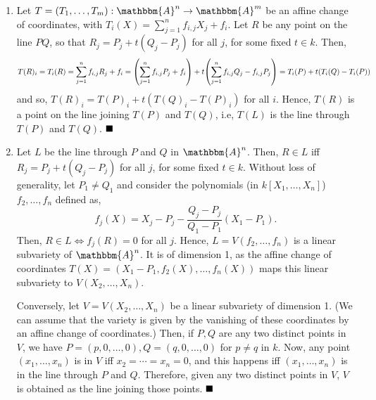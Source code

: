 \documentclass[12pt]{article}
\begin{document}
\begin{enumerate}[label = (\alph*)]
    \item Let \( T = (T_1, \dots, T_m): \mathbbm{A}^n \to \mathbbm{A}^m \) be an affine change of coordinates, with \( T_i(X) = \sum_{j=1}^{n}f_{i,j}X_j + f_i \). Let \( R \) be any point on the line \( PQ \), so that \( R_j = P_j + t(Q_j-P_j) \) for all \( j \), for some fixed \( t \in k \). Then,
          \[
              T(R)_i = T_i(R) = \sum_{j=1}^{n}f_{i,j}R_j + f_i = \qty(\sum_{j=1}^{n}f_{i,j}P_j + f_i) + t \qty(\sum_{j=1}^{n}f_{i,j}Q_j - f_{i,j}P_j) = T_i(P) + t(T_i(Q)-T_i(P))
          \]
          and so, \( T(R)_i = T(P)_i + t(T(Q)_i-T(P)_i) \) for all \( i \). Hence, \( T(R) \) is a point on the line joining \( T(P) \) and \( T(Q) \), i.e, \( T(L) \) is the line through \( T(P) \) and \( T(Q) \). \(\hfill \blacksquare\)
          \smallskip

    \item Let \( L \) be the line through \( P \) and \( Q \) in \( \mathbbm{A}^n \). Then, \( R \in L \) iff \( R_j = P_j + t(Q_j-P_j) \) for all \( j \), for some fixed \( t \in k \). Without loss of generality, let \( P_1 \neq Q_1 \) and consider the polynomials (in \( k[X_1, \dots, X_n] \)) \( f_2, \dots, f_n \) defined as,
          \[
              f_j(X) = X_j - P_j - \frac{Q_j-P_j}{Q_1-P_1}(X_1-P_1).
          \]
          Then, \( R \in L \iff f_j(R) = 0 \) for all \( j \). Hence, \( L = V(f_2, \dots, f_n) \) is a linear subvariety of \( \mathbbm{A}^n \). It is of dimension 1, as the affine change of coordinates \( T(X) = (X_1-P_1, f_2(X), \dots, f_n(X)) \) maps this linear subvariety to \( V(X_2, \dots, X_n) \).
          \smallskip

          Conversely, let \( V = V(X_2, \dots, X_n) \) be a linear subvariety of dimension 1. (We can assume that the variety is given by the vanishing of these coordinates by an affine change of coordinates.) Then, if \( P,Q \) are any two distinct points in \( V \), we have \( P = (p, 0, \dots, 0), Q = (q,0,\dots,0) \) for \( p \neq q \) in \( k \). Now, any point \( (x_1, \dots, x_n) \) is in \( V \) iff \( x_2 = \cdots = x_n = 0 \), and this happens iff \( (x_1, \dots, x_n) \) is in the line through \( P \) and \( Q \). Therefore, given any two distinct points in \( V \), \( V \) is obtained as the line joining those points. \(\hfill \blacksquare\)
          \smallskip


\end{enumerate}
\end{document}
